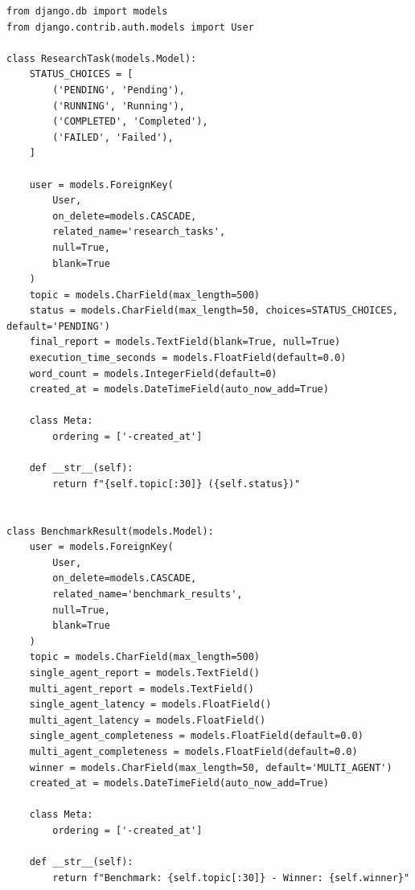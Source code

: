 \documentclass[12pt, a4paper]{article}
\begin{document}
\begin{lstlisting}[style=pythonstyle, caption={backend/api/models.py --- Django Domain Models}]
from django.db import models
from django.contrib.auth.models import User

class ResearchTask(models.Model):
    STATUS_CHOICES = [
        ('PENDING', 'Pending'),
        ('RUNNING', 'Running'),
        ('COMPLETED', 'Completed'),
        ('FAILED', 'Failed'),
    ]

    user = models.ForeignKey(
        User, 
        on_delete=models.CASCADE, 
        related_name='research_tasks', 
        null=True, 
        blank=True
    )
    topic = models.CharField(max_length=500)
    status = models.CharField(max_length=50, choices=STATUS_CHOICES, default='PENDING')
    final_report = models.TextField(blank=True, null=True)
    execution_time_seconds = models.FloatField(default=0.0)
    word_count = models.IntegerField(default=0)
    created_at = models.DateTimeField(auto_now_add=True)

    class Meta:
        ordering = ['-created_at']

    def __str__(self):
        return f"{self.topic[:30]} ({self.status})"


class BenchmarkResult(models.Model):
    user = models.ForeignKey(
        User, 
        on_delete=models.CASCADE, 
        related_name='benchmark_results', 
        null=True, 
        blank=True
    )
    topic = models.CharField(max_length=500)
    single_agent_report = models.TextField()
    multi_agent_report = models.TextField()
    single_agent_latency = models.FloatField()
    multi_agent_latency = models.FloatField()
    single_agent_completeness = models.FloatField(default=0.0)
    multi_agent_completeness = models.FloatField(default=0.0)
    winner = models.CharField(max_length=50, default='MULTI_AGENT')
    created_at = models.DateTimeField(auto_now_add=True)

    class Meta:
        ordering = ['-created_at']

    def __str__(self):
        return f"Benchmark: {self.topic[:30]} - Winner: {self.winner}"
\end{lstlisting}
\end{document}
